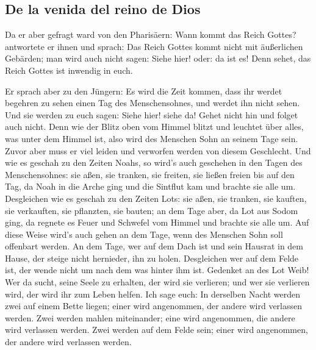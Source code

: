 \hypertarget{de-la-venida-del-reino-de-dios}{%
\subsection{De la venida del reino de
Dios}\label{de-la-venida-del-reino-de-dios}}

 Da er aber gefragt ward von den Pharisäern: Wann kommt
das Reich Gottes? antwortete er ihnen und sprach: Das Reich Gottes kommt
nicht mit äußerlichen Gebärden;  man wird auch nicht
sagen: Siehe hier! oder: da ist es! Denn sehet, das Reich Gottes ist
inwendig in euch.

 Er sprach aber zu den Jüngern: Es wird die Zeit kommen,
dass ihr werdet begehren zu sehen einen Tag des Menschensohnes, und
werdet ihn nicht sehen.  Und sie werden zu euch sagen:
Siehe hier! siehe da! Gehet nicht hin und folget auch nicht.
 Denn wie der Blitz oben vom Himmel blitzt und leuchtet
über alles, was unter dem Himmel ist, also wird des Menschen Sohn an
seinem Tage sein.  Zuvor aber muss er viel leiden und
verworfen werden von diesem Geschlecht.  Und wie es
geschah zu den Zeiten Noahs, so wird's auch geschehen in den Tagen des
Menschensohnes:  sie aßen, sie tranken, sie freiten, sie
ließen freien bis auf den Tag, da Noah in die Arche ging und die
Sintflut kam und brachte sie alle um.  Desgleichen wie es
geschah zu den Zeiten Lots: sie aßen, sie tranken, sie kauften, sie
verkauften, sie pflanzten, sie bauten;  an dem Tage aber,
da Lot aus Sodom ging, da regnete es Feuer und Schwefel vom Himmel und
brachte sie alle um.  Auf diese Weise wird's auch gehen
an dem Tage, wenn des Menschen Sohn soll offenbart werden.
 An dem Tage, wer auf dem Dach ist und sein Hausrat in
dem Hause, der steige nicht hernieder, ihn zu holen. Desgleichen wer auf
dem Felde ist, der wende nicht um nach dem was hinter ihm ist.
 Gedenket an des Lot Weib!  Wer da sucht,
seine Seele zu erhalten, der wird sie verlieren; und wer sie verlieren
wird, der wird ihr zum Leben helfen.  Ich sage euch: In
derselben Nacht werden zwei auf einem Bette liegen; einer wird
angenommen, der andere wird verlassen werden.  Zwei
werden mahlen miteinander; eine wird angenommen, die andere wird
verlassen werden.  Zwei werden auf dem Felde sein; einer
wird angenommen, der andere wird verlassen werden.

